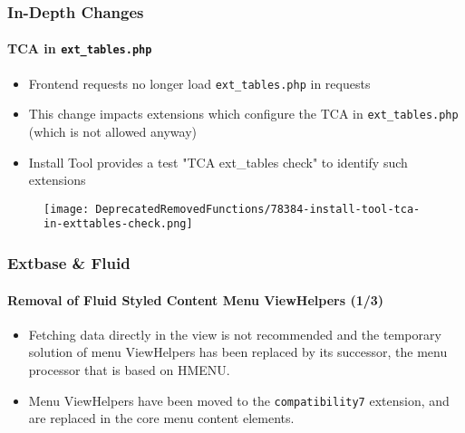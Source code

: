 \begin{frame}[fragile]
	\frametitle{In-Depth Changes}
	\framesubtitle{TCA in \texttt{ext\_tables.php}}

	\begin{itemize}
		\item Frontend requests no longer load \texttt{ext\_tables.php} in requests
		\item This change impacts extensions which configure the TCA in \texttt{ext\_tables.php}\newline
			\small(which is not allowed anyway)\normalsize
		\item Install Tool provides a test "TCA ext\_tables check" to identify such extensions
	\end{itemize}

	\begin{figure}
		\texttt{[image: DeprecatedRemovedFunctions/78384-install-tool-tca-in-exttables-check.png]}
	\end{figure}

\end{frame}


\begin{frame}[fragile]
	\frametitle{Extbase \& Fluid}
	\framesubtitle{Removal of Fluid Styled Content Menu ViewHelpers (1/3)}

	\begin{itemize}
		\item Fetching data directly in the view is not recommended and
			the temporary solution of menu ViewHelpers has been replaced by
			its successor, the menu processor that is based on HMENU.

		\item Menu ViewHelpers have been moved to the \texttt{compatibility7}
			extension, and are replaced in the core menu content elements.

	\end{itemize}

\end{frame}

